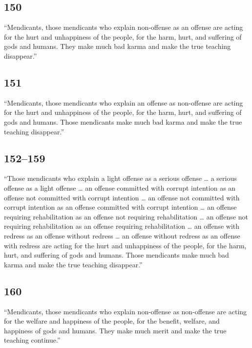 \documentclass[12pt,openany]{book}%
\begin{document}
\subsection*{150 }

“Mendicants, those mendicants who explain non-offense as an offense are acting for the hurt and unhappiness of the people, for the harm, hurt, and suffering of gods and humans. They make much bad karma and make the true teaching disappear.” 

\subsection*{151 }

“Mendicants, those mendicants who explain an offense as non-offense are acting for the hurt and unhappiness of the people, for the harm, hurt, and suffering of gods and humans. Those mendicants make much bad karma and make the true teaching disappear.” 

\subsection*{152–159 }

“Those mendicants who explain a light offense as a serious offense … a serious offense as a light offense … an offense committed with corrupt intention as an offense not committed with corrupt intention … an offense not committed with corrupt intention as an offense committed with corrupt intention … an offense requiring rehabilitation as an offense not requiring rehabilitation … an offense not requiring rehabilitation as an offense requiring rehabilitation … an offense with redress as an offense without redress … an offense without redress as an offense with redress are acting for the hurt and unhappiness of the people, for the harm, hurt, and suffering of gods and humans. Those mendicants make much bad karma and make the true teaching disappear.” 

\subsection*{160 }

“Mendicants, those mendicants who explain non-offense as non-offense are acting for the welfare and happiness of the people, for the benefit, welfare, and happiness of gods and humans. They make much merit and make the true teaching continue.” 
\end{document}

